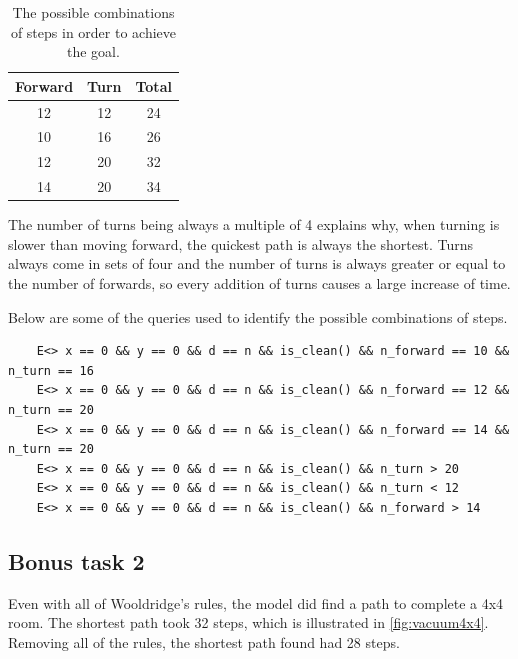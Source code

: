 \documentclass[11pt]{article}
\begin{document}
\begin{table}[!htbp]
\centering
\begin{tabular}{|c|c|c|}
\hline
\textbf{Forward} & \textbf{Turn} & \textbf{Total} \\ \hline
12               & 12            & 24             \\ \hline
10               & 16            & 26             \\ \hline
12               & 20            & 32             \\ \hline
14               & 20            & 34             \\ \hline
\end{tabular}
\caption{The possible combinations of steps in order to achieve the goal.}
\label{table:combinations}
\end{table}

The number of turns being always a multiple of 4 explains why, when turning is slower than moving forward, the quickest path is always the shortest.
Turns always come in sets of four and the number of turns is always greater or equal to the number of forwards, so every addition of turns causes a large increase of time.

Below are some of the queries used to identify the possible combinations of steps.

\begin{verbatim}
    E<> x == 0 && y == 0 && d == n && is_clean() && n_forward == 10 && n_turn == 16
    E<> x == 0 && y == 0 && d == n && is_clean() && n_forward == 12 && n_turn == 20
    E<> x == 0 && y == 0 && d == n && is_clean() && n_forward == 14 && n_turn == 20
    E<> x == 0 && y == 0 && d == n && is_clean() && n_turn > 20
    E<> x == 0 && y == 0 && d == n && is_clean() && n_turn < 12
    E<> x == 0 && y == 0 && d == n && is_clean() && n_forward > 14
\end{verbatim}

\subsection*{Bonus task 2}

Even with all of Wooldridge's rules, the model did find a path to complete a 4x4 room.
The shortest path took 32 steps, which is illustrated in \autoref{fig:vacuum4x4}.
Removing all of the rules, the shortest path found had 28 steps.
\end{document}
